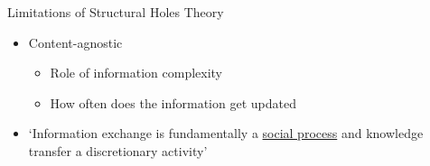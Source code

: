 \begin{frame}{{\color{violet} Limitations of Structural Holes Theory}}

  \begin{itemize}
    \item Content-agnostic
    \begin{itemize}
      \item Role of information complexity
      \item How often does the information get updated
    \end{itemize}
    \item `Information exchange is fundamentally a \underline{social process} and knowledge transfer a discretionary activity'
  \end{itemize}

\end{frame}
